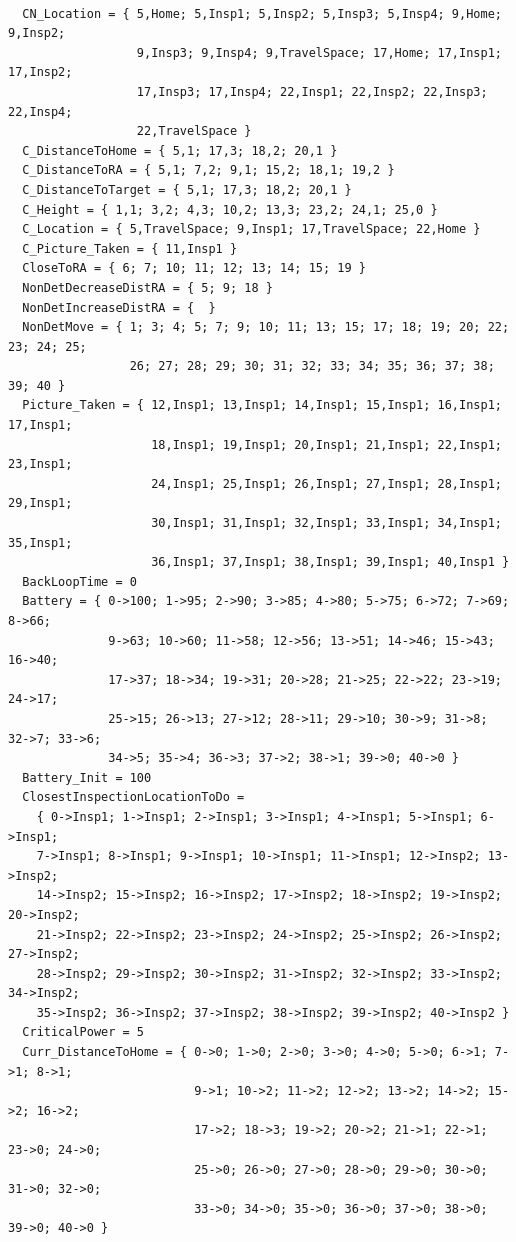 \documentclass[12pt]{extarticle}
\begin{document}
\begin{lstlisting}[basicstyle=\tiny]
  
  CN_Location = { 5,Home; 5,Insp1; 5,Insp2; 5,Insp3; 5,Insp4; 9,Home; 9,Insp2;
                  9,Insp3; 9,Insp4; 9,TravelSpace; 17,Home; 17,Insp1; 17,Insp2;
                  17,Insp3; 17,Insp4; 22,Insp1; 22,Insp2; 22,Insp3; 22,Insp4;
                  22,TravelSpace }
  C_DistanceToHome = { 5,1; 17,3; 18,2; 20,1 }
  C_DistanceToRA = { 5,1; 7,2; 9,1; 15,2; 18,1; 19,2 }
  C_DistanceToTarget = { 5,1; 17,3; 18,2; 20,1 }
  C_Height = { 1,1; 3,2; 4,3; 10,2; 13,3; 23,2; 24,1; 25,0 }
  C_Location = { 5,TravelSpace; 9,Insp1; 17,TravelSpace; 22,Home }
  C_Picture_Taken = { 11,Insp1 }
  CloseToRA = { 6; 7; 10; 11; 12; 13; 14; 15; 19 }
  NonDetDecreaseDistRA = { 5; 9; 18 }
  NonDetIncreaseDistRA = {  }
  NonDetMove = { 1; 3; 4; 5; 7; 9; 10; 11; 13; 15; 17; 18; 19; 20; 22; 23; 24; 25;
                 26; 27; 28; 29; 30; 31; 32; 33; 34; 35; 36; 37; 38; 39; 40 }
  Picture_Taken = { 12,Insp1; 13,Insp1; 14,Insp1; 15,Insp1; 16,Insp1; 17,Insp1;
                    18,Insp1; 19,Insp1; 20,Insp1; 21,Insp1; 22,Insp1; 23,Insp1;
                    24,Insp1; 25,Insp1; 26,Insp1; 27,Insp1; 28,Insp1; 29,Insp1; 
                    30,Insp1; 31,Insp1; 32,Insp1; 33,Insp1; 34,Insp1; 35,Insp1;
                    36,Insp1; 37,Insp1; 38,Insp1; 39,Insp1; 40,Insp1 }
  BackLoopTime = 0
  Battery = { 0->100; 1->95; 2->90; 3->85; 4->80; 5->75; 6->72; 7->69; 8->66;
              9->63; 10->60; 11->58; 12->56; 13->51; 14->46; 15->43; 16->40;
              17->37; 18->34; 19->31; 20->28; 21->25; 22->22; 23->19; 24->17;
              25->15; 26->13; 27->12; 28->11; 29->10; 30->9; 31->8; 32->7; 33->6;
              34->5; 35->4; 36->3; 37->2; 38->1; 39->0; 40->0 }
  Battery_Init = 100
  ClosestInspectionLocationToDo = 
    { 0->Insp1; 1->Insp1; 2->Insp1; 3->Insp1; 4->Insp1; 5->Insp1; 6->Insp1;
    7->Insp1; 8->Insp1; 9->Insp1; 10->Insp1; 11->Insp1; 12->Insp2; 13->Insp2;
    14->Insp2; 15->Insp2; 16->Insp2; 17->Insp2; 18->Insp2; 19->Insp2; 20->Insp2;
    21->Insp2; 22->Insp2; 23->Insp2; 24->Insp2; 25->Insp2; 26->Insp2; 27->Insp2;
    28->Insp2; 29->Insp2; 30->Insp2; 31->Insp2; 32->Insp2; 33->Insp2; 34->Insp2;
    35->Insp2; 36->Insp2; 37->Insp2; 38->Insp2; 39->Insp2; 40->Insp2 }
  CriticalPower = 5
  Curr_DistanceToHome = { 0->0; 1->0; 2->0; 3->0; 4->0; 5->0; 6->1; 7->1; 8->1;
                          9->1; 10->2; 11->2; 12->2; 13->2; 14->2; 15->2; 16->2;
                          17->2; 18->3; 19->2; 20->2; 21->1; 22->1; 23->0; 24->0;
                          25->0; 26->0; 27->0; 28->0; 29->0; 30->0; 31->0; 32->0;
                          33->0; 34->0; 35->0; 36->0; 37->0; 38->0; 39->0; 40->0 }

\end{lstlisting}
\end{document}
